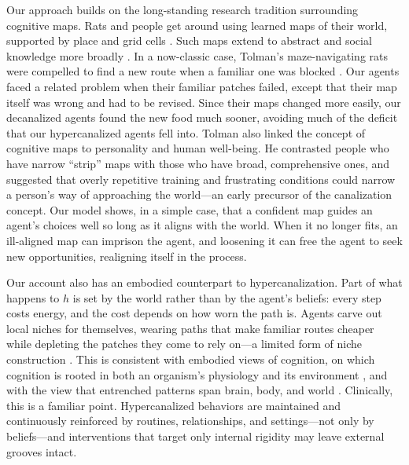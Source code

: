 \documentclass[12pt,fleqn]{article}
\begin{document}
Our approach builds on the long-standing research tradition surrounding cognitive maps. Rats and people get around using learned maps of their world, supported by place and grid cells \citep{okeefe_hippocampus_1978, hafting_microstructure_2005, ekstrom_cellular_2003}. Such maps extend to abstract and social knowledge more broadly \citep{behrens_cognitive_2018}. In a now-classic case, Tolman's maze-navigating rats were compelled to find a new route when a familiar one was blocked \citep{tolman_cognitive_1948}. Our agents faced a related problem when their familiar patches failed, except that their map itself was wrong and had to be revised. Since their maps changed more easily, our decanalized agents found the new food much sooner, avoiding much of the deficit that our hypercanalized agents fell into. Tolman also linked the concept of cognitive maps to personality and human well-being. He contrasted people who have narrow ``strip'' maps with those who have broad, comprehensive ones, and suggested that overly repetitive training and frustrating conditions could narrow a person's way of approaching the world---an early precursor of the canalization concept. Our model shows, in a simple case, that a confident map guides an agent's choices well so long as it aligns with the world. When it no longer fits, an ill-aligned map can imprison the agent, and loosening it can free the agent to seek new opportunities, realigning itself in the process.

Our account also has an embodied counterpart to hypercanalization. Part of what happens to $h$ is set by the world rather than by the agent's beliefs: every step costs energy, and the cost depends on how worn the path is. Agents carve out local niches for themselves, wearing paths that make familiar routes cheaper while depleting the patches they come to rely on---a limited form of niche construction \citep{laland_niche_2016, pio-lopez_scale-free_2025}. This is consistent with embodied views of cognition, on which cognition is rooted in both an organism's physiology and its environment \citep{lyon_reframing_2021}, and with the view that entrenched patterns span brain, body, and world \citep{hipolito_pattern_2023}. Clinically, this is a familiar point. Hypercanalized behaviors are maintained and continuously reinforced by routines, relationships, and settings---not only by beliefs---and interventions that target only internal rigidity may leave external grooves intact.
\end{document}

